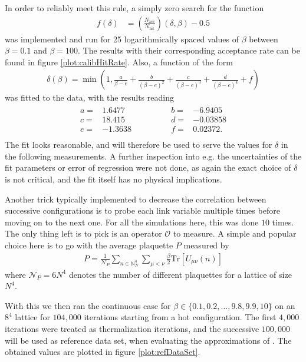 In order to reliably meet this rule, a simply zero search for the function
\begin{align*}
 f(\delta) & = \left(\frac{N_{\textrm{acc}}}{N_{\textrm{hit}}}\right)(\delta, \beta) - 0.5
\end{align*}
was implemented and run for 25 logarithmically spaced values of $\beta$ between $\beta=0.1$ and $\beta = 100$. The results with their corresponding acceptance rate can be found in figure \ref{plot:calibHitRate}. Also, a function of the form
\begin{align*}
 \delta(\beta) = \min \left(1,\frac{a}{\beta-e} + \frac{b}{(\beta-e)^2} +  \frac{c}{(\beta-e)^3} + \frac{d}{(\beta-e)^4} + f \right)
\end{align*}
was fitted to the data, with the results reading
\begin{align*}
 \begin{array}{rlrl}
  a= & 1.6477  \qquad \qquad & b= & -6.9405               \\
  c= & 18.415  \qquad \qquad & d= & -0.03858 \\
  e= & -1.3638 \qquad \qquad & f= & 0.02372 \textrm{.}    \\
 \end{array}
\end{align*}
The fit looks reasonable, and will therefore be used to serve the values for $\delta$ in the following measurements. A further inspection into e.g. the uncertainties of the fit parameters or error of regression were not done, as again the exact choice of $\delta$ is not critical, and the fit itself has no physical implications.

Another trick typically implemented to decrease the correlation between successive configurations is to probe each link variable multiple times before moving on to the next one. For all the simulations here, this was done $10$ times.\\

The only thing left is to pick is an operator $\mathcal{O}$ to measure. A simple and popular choice here is to go with the average plaquette $P$ measured by
\begin{align*}
 P = \frac{1}{\mathcal{N}_P} \sum_{n \in \mathbb{N}^4_N} \sum_{\mu < \nu} \frac{\beta}{2} \mathrm{Tr} \left[ U_{\mu \nu} (n) \right]
\end{align*}
where $\mathcal{N}_P = 6 N^4$ denotes the number of different plaquettes for a lattice of size $N^4$.

With this we then ran the continuous case for $\beta \in \{0.1,0.2,\dots,9.8,9.9,10\}$ on an $8^4$ lattice for $104,000$ iterations starting from a hot configuration. The first $4,000$ iterations were treated as thermalization iterations, and the successive $100,000$ will be used as reference data set, when evaluating the approximations of \SUTwo. The obtained values are plotted in figure \ref{plot:refDataSet}.

